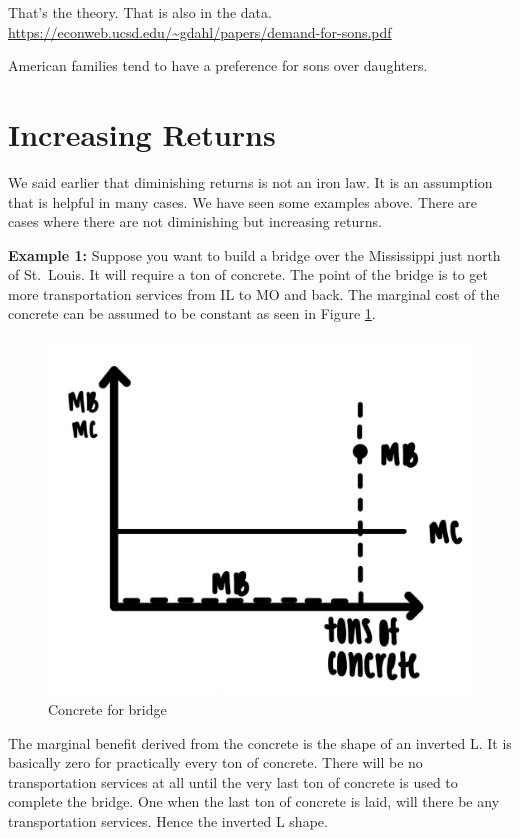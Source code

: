 \documentclass[
]{book}
\begin{document}
That's the theory. That is also in the data. \url{https://econweb.ucsd.edu/~gdahl/papers/demand-for-sons.pdf}

American families tend to have a preference for sons over daughters.

\hypertarget{increasing-returns}{%
\section{Increasing Returns}\label{increasing-returns}}

We said earlier that diminishing returns is not an iron law. It is an assumption that is helpful in many cases. We have seen some examples above. There are cases where there are not diminishing but increasing returns.

\textbf{Example 1:} Suppose you want to build a bridge over the Mississippi just north of St.~Louis. It will require a ton of concrete. The point of the bridge is to get more transportation services from IL to MO and back. The marginal cost of the concrete can be assumed to be constant as seen in Figure \ref{fig:fig209}.

\begin{figure}

{\centering \includegraphics[width=0.75\linewidth]{img/ch2/fig9} 

}

\caption{Concrete for bridge}\label{fig:fig209}
\end{figure}

The marginal benefit derived from the concrete is the shape of an inverted L. It is basically zero for practically every ton of concrete. There will be no transportation services at all until the very last ton of concrete is used to complete the bridge. One when the last ton of concrete is laid, will there be any transportation services. Hence the inverted L shape.
\end{document}
